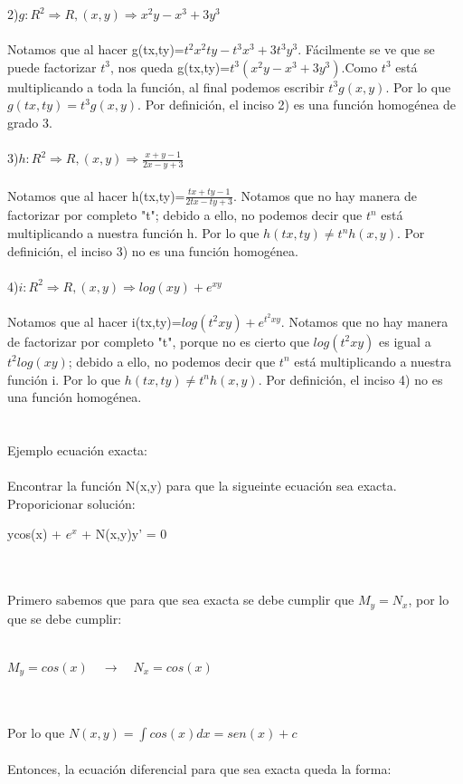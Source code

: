 \documentclass[a4paper,10pt]{article}
\begin{document}
2)$ g: R^2 \Rightarrow R, (x,y) \Rightarrow x^2y-x^3 + 3y^3$\\\\Notamos que al hacer g(tx,ty)=$t^2 x^2 ty - t^3 x^3 + 3t^3y^3$. Fácilmente se ve que se puede factorizar $t^3$, nos queda g(tx,ty)=$t^3( x^2 y -  x^3 + 3y^3)$.Como $t^3$ está multiplicando a toda la función, al final podemos escribir $t^3 g(x,y)$. Por lo que $g(tx,ty)= t^3 g(x,y)$. Por definición, el inciso 2) es una función homogénea de grado 3.\\\\
3)$h: R^2 \Rightarrow R, (x,y) \Rightarrow \frac{x+y-1}{2x-y+3} $\\\\
Notamos que al hacer h(tx,ty)=$\frac{tx+ty-1}{2tx-ty+3}$. Notamos que no hay manera de factorizar por completo "t"; debido a ello, no podemos decir que $t^n$ está multiplicando a nuestra función h. Por lo que $h(tx,ty)\neq t^n h(x,y)$. Por definición, el inciso 3) no es una función homogénea.\\\\
4)$i: R^2 \Rightarrow R, (x,y) \Rightarrow log(xy)+ e^{xy}$\\\\
Notamos que al hacer i(tx,ty)=$log(t^2xy)+ e^{t^2xy}$. Notamos que no hay manera de factorizar por completo "t", porque no es cierto que $log(t^2xy)$ es igual a $t^2 log(xy)$; debido a ello, no podemos decir que $t^n$ está multiplicando a nuestra función i. Por lo que $h(tx,ty)\neq t^n h(x,y)$. Por definición, el inciso 4) no es una función homogénea.\\\\\\
Ejemplo ecuación exacta:\\\\
Encontrar la función N(x,y) para que la sigueinte ecuación sea exacta. Proporicionar solución:\\
\centerline{ycos(x) + $e^x$ + N(x,y)y' = 0 }\\\\
Primero sabemos que para que sea exacta se debe cumplir que $M_y = N_x$, por lo que se debe cumplir:\\\\
\centerline{$M_y = cos(x) \quad\rightarrow\quad N_x=cos(x)$}\\\\
Por lo que $N(x,y) = \int cos(x) dx = sen(x)+c$\\\\
Entonces, la ecuación diferencial para que sea exacta queda la forma:\\\\
\end{document}
